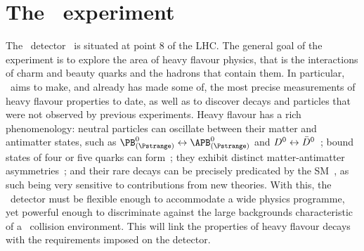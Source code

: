 \chapter{The \lhcb\ experiment}
\label{chap:intro:lhcb}

The \lhcb\ detector~\cite{Alves:2008zz,Aaij:2014jba} is situated at point 8 of 
the \ac{LHC}.
The general goal of the experiment is to explore the area of heavy flavour 
physics, that is the interactions of charm and beauty quarks and the hadrons 
that contain them.
In particular, \lhcb\ aims to make, and already has made some of, the most 
precise measurements of heavy flavour properties to date, as well as to 
discover decays and particles that were not observed by previous experiments.
Heavy flavour has a rich phenomenology: neutral particles can oscillate between 
their matter and antimatter states, such as $\PBds \leftrightarrow \APBds$ and 
$D^{0} \leftrightarrow \bar{D}^{0}$~\cite{Abulencia:2006ze,Aaij:2012nva}; bound 
states of four or five quarks can form~\cite{Aaij:2014jqa,Aaij:2015tga}; they 
exhibit distinct matter-antimatter 
asymmetries~\cite{Aubert:2001nu,Abe:2001xe,Aaij:2012kz,Aaij:2013iua,Aaij:2016cla}; 
and their rare decays can be precisely predicated by the 
\ac{SM}~\cite{CMS:2014xfa,Aaij:2015oid}, as such being very sensitive to 
contributions from new theories.
With this, the \lhcb\ detector must be flexible enough to accommodate a wide 
physics programme, yet powerful enough to discriminate against the large 
backgrounds characteristic of a \pp\ collision environment.
This  will link the properties of heavy flavour 
decays with the requirements imposed on the detector.

